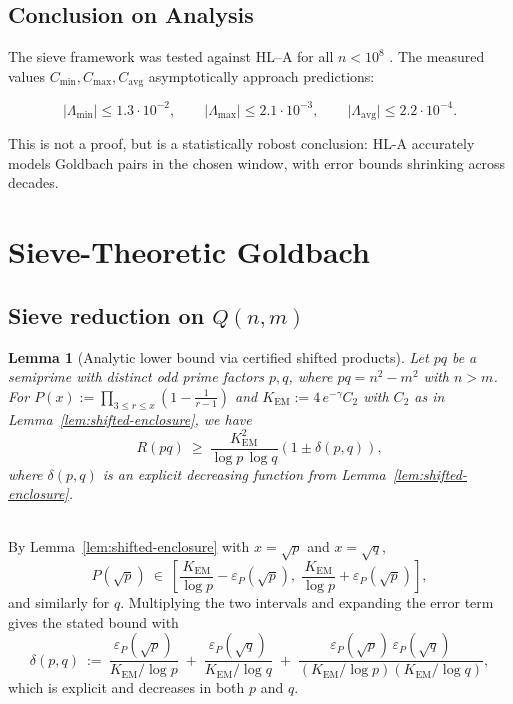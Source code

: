 \documentclass[11pt]{article}
\makeatletter
\theoremstyle{inline}
\theoremstyle{break}
\newtheorem{lemma}{Lemma}
\renewenvironment{proof}[1][\proofname]{%
  \par\pushQED{\qed}%
  \normalfont \topsep6\p@\@plus6\p@\relax
  \trivlist
  \item[\hskip\labelsep
        \itshape
    #1\@addpunct{.}]\mbox{}\\  %
}{%
  \popQED\endtrivlist\@endpefalse
}
\theoremstyle{break}
\theoremstyle{break}
\theoremstyle{break}
\theoremstyle{break}
\theoremstyle{break}
\theoremstyle{break}
\theoremstyle{inline}
\newcommand{\xSecondLambdaMinLimit}{1.3\cdot 10^{-2}} %
\newcommand{\xSecondLambdaMaxLimit}{2.1\cdot 10^{-3}} %
\newcommand{\xSecondLambdaAvgLimit}{2.2\cdot 10^{-4}} %
\newcommand{\tavg}{{\scriptscriptstyle\mathrm{avg}}}
\newcommand{\Cmeas}{C}              %
\newcommand{\Kem}{K_{\mathrm{EM}}}              %
\makeatother
\begin{document}

\subsection{Conclusion on Analysis}

The sieve framework was tested against HL–A for all \( n<10^8 \) . The measured values \( \Cmeas_{\min},\Cmeas_{\max},\Cmeas_{\tavg} \) asymptotically approach predictions:

\begin{equation}
\lvert \Lambda_{\min} \rvert \le \xSecondLambdaMinLimit,\qquad
\lvert \Lambda_{\max} \rvert \le \xSecondLambdaMaxLimit,\qquad
\lvert \Lambda_{\tavg} \rvert \le \xSecondLambdaAvgLimit.
\end{equation}

This is not a proof, but is a statistically robost conclusion: HL-A accurately models Goldbach pairs in the chosen window, with error bounds shrinking across decades.

\section{Sieve-Theoretic Goldbach}\label{sec:sgb}

\subsection{Sieve reduction on \( Q(n,m) \)}\label{sec:reduction}
\begin{lemma}[Analytic lower bound via certified shifted products]
\label{lem:analytic-lower-bound-reduction}
Let \( pq \) be a semiprime with distinct odd prime factors \( p,q \), where \( pq=n^2-m^2 \) with \( n>m \). 
For \( P(x):=\prod_{3\le r\le x}(1-\tfrac{1}{r-1}) \) and \( \Kem:=4\,e^{-\gamma}C_2 \) with \( C_2 \) as in Lemma~\ref{lem:shifted-enclosure}, we have
\begin{equation}
R(pq)\ \ge\ \frac{\Kem^2}{\log p\,\log q}
\left(1 \pm \delta(p,q)\right),
\end{equation}
where \( \delta(p,q) \) is an explicit decreasing function from Lemma~\ref{lem:shifted-enclosure}.
\end{lemma}

\begin{proof}
By Lemma~\ref{lem:shifted-enclosure} with \( x=\sqrt{p} \) and \( x=\sqrt{q} \),
\begin{equation}
P(\sqrt{p})\ \in\ \left[\frac{\Kem}{\log p} - \varepsilon_P(\sqrt{p}),\; \frac{\Kem}{\log p} + \varepsilon_P(\sqrt{p})\right],
\end{equation}
and similarly for \( q \). Multiplying the two intervals and expanding the error term gives the stated bound with
\begin{equation}
\delta(p,q)\ :=\ \frac{\varepsilon_P(\sqrt{p})}{\Kem/\log p} \;+\; \frac{\varepsilon_P(\sqrt{q})}{\Kem/\log q} \;+\; \frac{\varepsilon_P(\sqrt{p})\,\varepsilon_P(\sqrt{q})}{(\Kem/\log p)(\Kem/\log q)},
\end{equation}
which is explicit and decreases in both \( p \) and \( q \).
\end{proof}
\end{document}
